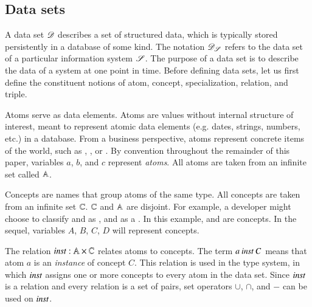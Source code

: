 \documentclass{elsarticle}
\begin{document}
\subsection{Data sets}
\label{sct:Data sets}
   A data set $\mathscr{D}$ describes a set of structured data, which is typically stored persistently in a database of some kind.
   The notation $\mathscr{D}_{\mathscr{S}}$ refers to the data set of a particular information system $\mathscr{S}$.
   The purpose of a data set is to describe the data of a system at one point in time. 
   Before defining data sets, let us first define the constituent notions of atom, concept, specialization, relation, and triple.
   
   Atoms serve as data elements.
   Atoms are values without internal structure of interest, meant to represent atomic data elements (e.g. dates, strings, numbers, etc.) in a database.
   From a business perspective, atoms represent concrete items of the world,
   such as , , or .
   By convention throughout the remainder of this paper, variables $a$, $b$, and $c$ represent \emph{atoms}.
   All atoms are taken from an infinite set called $\mathbb{A}$.
   
   Concepts are names that group atoms of the same type.
   All concepts are taken from an infinite set $\mathbb{C}$.
   $\mathbb{C}$ and $\mathbb{A}$ are disjoint.
   For example, a developer might choose to classify  and  as ,
   and  as a .
   In this example,  and  are concepts.
   In the sequel, variables $A$, $B$, $C$, $D$ will represent concepts.

   The relation $\mathbin{\text{\it inst\/}}:\mathbb{A}\times\mathbb{C}$ relates atoms to concepts.
   The term $a\mathbin{\text{\it inst\/}} C$ means that atom $a$ is an \emph{instance} of concept $C$.
   This relation is used in the type system, in which $\mathbin{\text{\it inst\/}}$ assigns one or more concepts to every atom in the data set.
   Since $\mathbin{\text{\it inst\/}}$ is a relation and every relation is a set of pairs,
   set operators $\cup$, $\cap$, and $-$ can be used on $\mathbin{\text{\it inst\/}}$.

\end{document}
